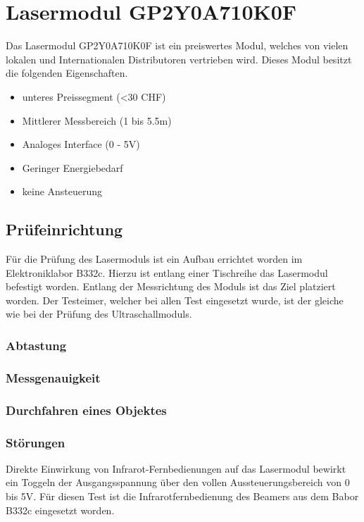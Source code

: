 \section{Lasermodul GP2Y0A710K0F}
Das Lasermodul GP2Y0A710K0F ist ein preiswertes Modul, welches von
vielen lokalen und Internationalen Distributoren vertrieben wird. 
Dieses Modul besitzt die folgenden Eigenschaften.

\begin{itemize}
	\item unteres Preissegment (<30 CHF)
	\item Mittlerer Messbereich (1 bis 5.5m)
	\item Analoges Interface (0 - 5V)
	\item Geringer Energiebedarf
	\item keine Ansteuerung
\end{itemize}

\subsection{Prüfeinrichtung}
Für die Prüfung des Lasermoduls ist ein Aufbau errichtet worden im
Elektroniklabor B332c. Hierzu ist entlang einer Tischreihe das 
Lasermodul befestigt worden. Entlang der Messrichtung des Moduls
ist das Ziel platziert worden. Der Testeimer, welcher bei allen
Test eingesetzt wurde, ist der gleiche wie bei der Prüfung des
Ultraschallmoduls.

\subsubsection{Abtastung}

\subsubsection{Messgenauigkeit}

\subsubsection{Durchfahren eines Objektes}

\subsubsection{Störungen}
Direkte Einwirkung von Infrarot-Fernbedienungen auf das Lasermodul
bewirkt ein Toggeln der Ausgangsspannung über den vollen 
Aussteuerungsbereich von 0 bis 5V. Für diesen Test ist die 
Infrarotfernbedienung des Beamers aus dem Babor B332c eingesetzt
worden.
